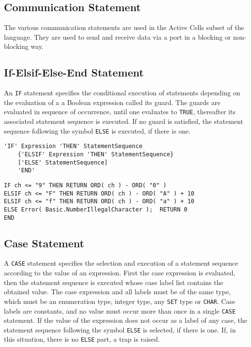 \documentclass[a4wide,11pt]{article}
\begin{document}
\subsection{Communication Statement}
The various communication statements are used in the Active Cells subset of the language.
They are used to send and receive data via a port in a blocking or non-blocking way.

\subsection{If-Elsif-Else-End Statement}
An \lstinline"IF" statement specifies the conditional execution of statements depending on the evaluation of a a Boolean expression called its guard.
The guards are evaluated in sequence of occurrence, until one evaluates to \lstinline"TRUE", thereafter its associated statement sequence is executed.
If no guard is satisfied, the statement sequence following the symbol \lstinline"ELSE" is executed, if there is one.

\begin{lstlisting}[style=ebnf]
'IF' Expression 'THEN' StatementSequence
    {'ELSIF' Expression 'THEN' StatementSequence}
    ['ELSE' StatementSequence]
    'END'
\end{lstlisting}

\begin{annotation}
\begin{lstlisting}[style=example]
IF ch <= "9" THEN RETURN ORD( ch ) - ORD( "0" )
ELSIF ch <= "F" THEN RETURN ORD( ch ) - ORD( "A" ) + 10
ELSIF ch <= "f" THEN RETURN ORD( ch ) - ORD( "a" ) + 10
ELSE Error( Basic.NumberIllegalCharacter );  RETURN 0
END
\end{lstlisting}
\end{annotation}



\subsection{Case Statement}
A \lstinline"CASE" statement specifies the selection and execution of a statement sequence according to the value of an expression.
First the case expression is evaluated, then the statement sequence is executed whose case label list contains the obtained value.
The case expression and all labels must be of the same type, which must be an enumeration type, integer type, any \lstinline"SET" type or \lstinline"CHAR".
Case labels are constants, and no value must occur more than once in a single \lstinline"CASE" statement.
If the value of the expression does not occur as a label of any case, the statement sequence following the symbol \lstinline"ELSE" is selected, if there is one.
If, in this situation, there is no \lstinline"ELSE" part, a trap is raised.
\end{document}
